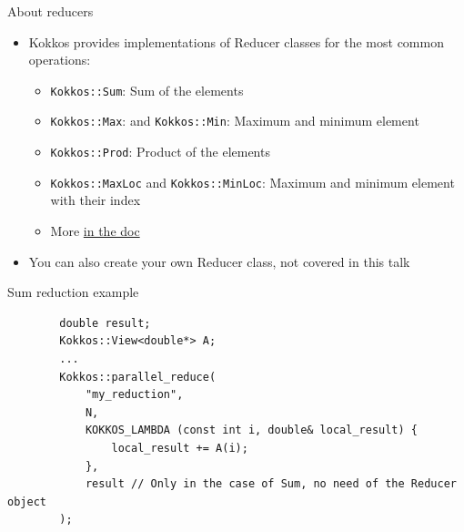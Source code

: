 \documentclass[
    aspectratio=169,
]{beamer}
\begin{document}
\begin{frame}{About reducers}
    \begin{itemize}
        \item Kokkos provides implementations of Reducer classes for the most common operations:
        \begin{itemize}
            \item \texttt{Kokkos::Sum}: Sum of the elements
            \item \texttt{Kokkos::Max}: and \texttt{Kokkos::Min}: Maximum and minimum element
            \item \texttt{Kokkos::Prod}: Product of the elements
            \item \texttt{Kokkos::MaxLoc} and \texttt{Kokkos::MinLoc}: Maximum and minimum element with their index
            \item More \href{https://kokkos.org/kokkos-core-wiki/ProgrammingGuide/Custom-Reductions-Built-In-Reducers.html}{in the doc}
        \end{itemize}
        \item You can also create your own Reducer class, not covered in this talk
    \end{itemize}
\end{frame}

\begin{frame}[fragile]{Sum reduction example}
    \begin{verbatim}
        double result;
        Kokkos::View<double*> A;
        ...
        Kokkos::parallel_reduce(
            "my_reduction",
            N,
            KOKKOS_LAMBDA (const int i, double& local_result) {
                local_result += A(i);
            },
            result // Only in the case of Sum, no need of the Reducer object
        );
    \end{verbatim}
\end{frame}
\end{document}
